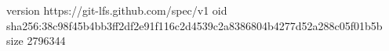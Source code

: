 version https://git-lfs.github.com/spec/v1
oid sha256:38c98f45b4bb3ff2df2e91f116c2d4539c2a8386804b4277d52a288c05f01b5b
size 2796344

